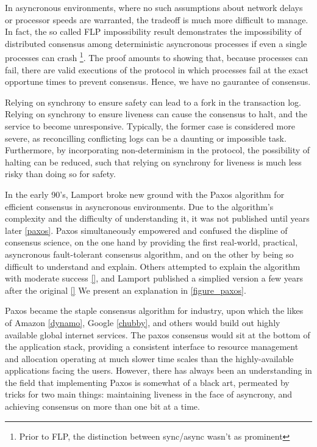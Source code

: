 In asyncronous environments, where no such assumptions about network delays or processor speeds are warranted,
the tradeoff is much more difficult to manage.
In fact, the so called FLP impossibility result demonstrates the impossibility of distributed consensus among deterministic asyncronous processes if even a single processes can crash 
\footnote{Prior to FLP, the distinction between sync/async wasn't as prominent}.
The proof amounts to showing that, because processes can fail, 
there are valid executions of the protocol in which processes fail at the exact opportune times to prevent consensus.
Hence, we have no gaurantee of consensus.

Relying on synchrony to ensure safety can lead to a fork in the transaction log.
Relying on synchrony to ensure liveness can cause the consensus to halt, and the service to become unresponsive.
Typically, the former case is considered more severe, as reconcilling conflicting logs can be a daunting or impossible task. 
Furthermore, by incorporating non-determinism in the protocol, the possibility of halting can be reduced,
such that relying on synchrony for liveness is much less risky than doing so for safety. 

In the early 90's, Lamport broke new ground with the Paxos algorithm for efficient consensus in asyncronous environments.
Due to the algorithm's complexity and the difficulty of understanding it, it was not published until years later \ref{paxos}.
Paxos simultaneously empowered and confused the displine of consensus science,
on the one hand by providing the first real-world, practical, asyncronous fault-tolerant consensus algorithm,
and on the other by being so difficult to understand and explain.
Others attempted to explain the algorithm with moderate success \ref{}, and Lamport published a simplied version 
a few years after the original \ref{}
We present an explanation in \ref{figure_paxos}.

Paxos became the staple consensus algorithm for industry, upon which the likes of Amazon \ref{dynamo}, Google \ref{chubby}, and others would build out highly available global internet services.
The paxos consensus would sit at the bottom of the application stack, providing a consistent interface to resource management and allocation operating at much slower time scales than the highly-available applications facing the users.
However, there has always been an understanding in the field that implementing Paxos is somewhat of a black art,
permeated by tricks for two main things: maintaining liveness in the face of asyncrony, and achieving consensus on more than one bit at a time.

